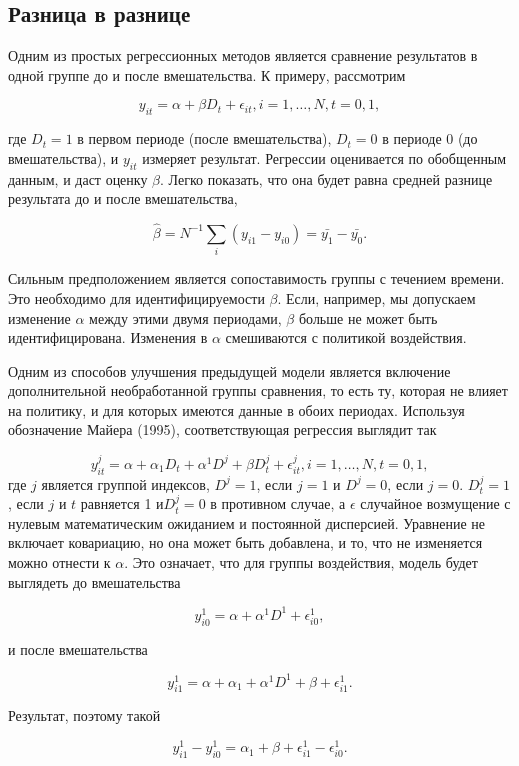 \subsection{Разница в разнице}


Одним из простых регрессионных методов является сравнение результатов в одной группе до и после вмешательства. К примеру, рассмотрим

\[
y_{it}=\alpha+\beta D_{t} +\epsilon_{it}, i=1, \dots, N, t=0,1,
\]

где $D_{t}=1$ в первом периоде (после вмешательства), $D_{t}=0$ в периоде 0 (до вмешательства), и $y_{it}$ измеряет результат. Регрессии оценивается по обобщенным данным, и даст оценку $\beta$. Легко показать, что она будет равна  средней разнице результата до и после вмешательства,


\[
\hat{\beta}=N^{-1}\sum_{i}(y_{i1}-y_{i0})=\bar{y_{1}}-\bar{y_{0}}.
\]

Сильным предположением является сопоставимость группы с течением времени. Это необходимо для идентифицируемости $\beta$. Если, например, мы допускаем изменение $\alpha$ между этими двумя периодами, $\beta$ больше не может быть идентифицирована. Изменения в $\alpha$ смешиваются с политикой воздействия.

Одним из способов улучшения предыдущей модели является включение дополнительной необработанной группы сравнения, то есть ту, которая не влияет на политику, и для которых имеются данные в обоих периодах. Используя обозначение Майера (1995), соответствующая регрессия выглядит так


\[
y^{j}_{it}=\alpha+\alpha_{1}D_{t}+\alpha^{1}D^{j}+\beta D^{j}_{t} +\epsilon^{j}_{it}, i=1, \dots, N, t=0,1,
\]
где $j$ является группой индексов, $D^{j}=1$, если $j=1$ и $D^{j}=0$, если $j=0$.  $D^{j}_{t}=1$, если $j$ и $t$ равняется 1 и$D^{j}_{t}=0$ в противном случае, а $\epsilon$ случайное возмущение с нулевым математическим ожиданием и постоянной дисперсией. Уравнение не включает ковариацию, но она может быть добавлена, и то, что не изменяется можно отнести к $\alpha$. Это означает, что для группы воздействия, модель будет выглядеть до вмешательства

\[
y^{1}_{i0}=\alpha+\alpha^{1}D^{1}+\epsilon^{1}_{i0},
\]

и после вмешательства

\[
y^{1}_{i1}=\alpha+\alpha_{1}+\alpha^{1}D^{1}+\beta +\epsilon^{1}_{i1}.
\]

Результат, поэтому такой

\begin{equation}
y^{1}_{i1}-y^{1}_{i0}=\alpha_{1}+\beta+\epsilon^{1}_{i1}-\epsilon^{1}_{i0}.
\end{equation}

